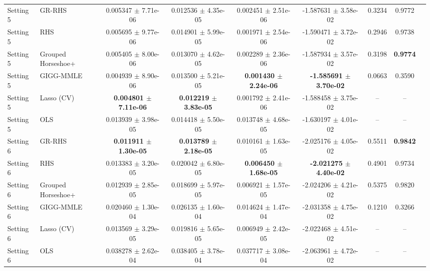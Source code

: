 \documentclass[11pt]{article}
\begin{document}
\begin{table}[p]
\begin{adjustbox}{max width=\textwidth}
\begin{tabular}{llccccccc}
\midrule
Setting 5 & GR-RHS & 0.005347 $\pm$ 7.71e-06 & 0.012536 $\pm$ 4.35e-05 & 0.002451 $\pm$ 2.51e-06 & -1.587631 $\pm$ 3.58e-02 & 0.3234 & 0.9772 \\
Setting 5 & RHS & 0.005695 $\pm$ 9.77e-06 & 0.014901 $\pm$ 5.99e-05 & 0.001971 $\pm$ 2.54e-06 & -1.590471 $\pm$ 3.72e-02 & 0.2946 & 0.9738 \\
Setting 5 & Grouped Horseshoe+ & 0.005405 $\pm$ 8.00e-06 & 0.013070 $\pm$ 4.62e-05 & 0.002289 $\pm$ 2.36e-06 & -1.587934 $\pm$ 3.57e-02 & 0.3198 & \textbf{0.9774} \\
Setting 5 & GIGG-MMLE & 0.004939 $\pm$ 8.90e-06 & 0.013500 $\pm$ 5.21e-05 & \textbf{0.001430 $\pm$ 2.24e-06} & \textbf{-1.585691 $\pm$ 3.70e-02} & 0.0663 & 0.3590 \\
Setting 5 & Lasso (CV) & \textbf{0.004801 $\pm$ 7.11e-06} & \textbf{0.012219 $\pm$ 3.83e-05} & 0.001792 $\pm$ 2.41e-06 & -1.588458 $\pm$ 3.75e-02 & -- & -- \\
Setting 5 & OLS & 0.013939 $\pm$ 3.98e-05 & 0.014418 $\pm$ 5.50e-05 & 0.013748 $\pm$ 4.68e-05 & -1.630197 $\pm$ 4.01e-02 & -- & -- \\
\midrule
Setting 6 & GR-RHS & \textbf{0.011911 $\pm$ 1.30e-05} & \textbf{0.013789 $\pm$ 2.18e-05} & 0.010161 $\pm$ 1.63e-05 & -2.025176 $\pm$ 4.05e-02 & 0.5511 & \textbf{0.9842} \\
Setting 6 & RHS & 0.013383 $\pm$ 3.20e-05 & 0.020042 $\pm$ 6.80e-05 & \textbf{0.006450 $\pm$ 1.68e-05} & \textbf{-2.021275 $\pm$ 4.40e-02} & 0.4901 & 0.9734 \\
Setting 6 & Grouped Horseshoe+ & 0.012939 $\pm$ 2.85e-05 & 0.018699 $\pm$ 5.97e-05 & 0.006921 $\pm$ 1.57e-05 & -2.024206 $\pm$ 4.21e-02 & 0.5375 & 0.9820 \\
Setting 6 & GIGG-MMLE & 0.020460 $\pm$ 1.30e-04 & 0.026135 $\pm$ 1.60e-04 & 0.014624 $\pm$ 1.47e-04 & -2.031358 $\pm$ 4.75e-02 & 0.1210 & 0.3266 \\
Setting 6 & Lasso (CV) & 0.013569 $\pm$ 3.29e-05 & 0.019816 $\pm$ 5.65e-05 & 0.006949 $\pm$ 2.42e-05 & -2.022468 $\pm$ 4.51e-02 & -- & -- \\
Setting 6 & OLS & 0.038278 $\pm$ 2.62e-04 & 0.038405 $\pm$ 3.78e-04 & 0.037717 $\pm$ 3.08e-04 & -2.063961 $\pm$ 4.72e-02 & -- & -- \\
\bottomrule
\end{tabular}
\end{adjustbox}
\end{table}
\end{document}
